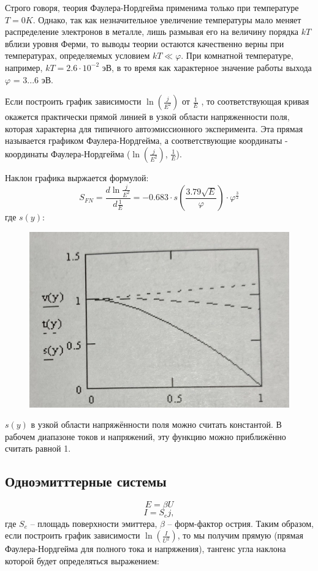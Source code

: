 \documentclass[12pt,a4paper]{article}
\begin{document}
Строго говоря, теория Фаулера-Нордгейма применима только при температуре $T = 0K$. Однако, так как незначительное увеличение температуры мало меняет распределение электронов в металле, лишь размывая его на величину порядка $kT$ вблизи уровня Ферми, то выводы теории остаются качественно верны при температурах, определяемых условием $kT \ll \varphi$. При комнатной температуре, например, $kT = 2.6 \cdot 10^{-2}$ эВ, в то время как характерное значение работы выхода $\varphi$ = 3...6 эВ.

Если построить график зависимости $\ln(\frac{j}{E^{2}})$ от $\frac{1}{E}$ , то соответствующая кривая окажется практически прямой линией в узкой области напряженности поля, которая характерна для типичного автоэмиссионного эксперимента. Эта прямая называется графиком Фаулера-Нордгейма, а соответствующие координаты - координаты Фаулера-Нордгейма ($\ln(\frac{j}{E^{2}})$, $\frac{1}{E}$).

Наклон графика выржается формулой: $$S_{FN} = \frac{d \ln{\frac{j}{E^2}}}{d \frac{1}{E}} = -0.683\cdot s(\frac{3.79 \sqrt{E}}{\varphi}) \cdot \varphi^{\frac{3}{2}}$$
где $s(y)$:
\begin{figure}[H]
\centering
	\includegraphics[width=0.3\linewidth]{ы(н).jpg}
\end{figure}
$s(y)$ в узкой области напряжённости поля можно считать константой. В рабочем диапазоне токов и напряжений, эту функцию можно приближённо считать равной 1.

\subsection{Одноэмитттерные системы}

\begin{equation}
 E = \beta U
\end{equation}
\begin{equation}
I = S_{e}j,
\end{equation}
где $S_{e}$ – площадь поверхности эмиттера, $\beta$ – форм-фактор острия.
Таким образом, если построить график зависимости $\ln(\frac{I}{U^2})$, то мы получим прямую (прямая Фаулера-Нордгейма для полного тока и напряжения), тангенс угла наклона которой будет определяться выражением:
\end{document}
